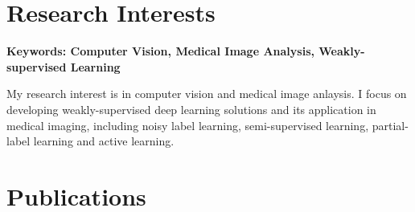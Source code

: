 \documentclass[letterpaper,11pt]{article}
\newcommand{\resumeSubHeadingListStart}{\begin{itemize}[leftmargin=0.15in, label={}]}
\newcommand{\resumeSubHeadingListEnd}{\end{itemize}}
\begin{document}

\section{Research Interests}
  \vspace{2pt}
  \resumeSubHeadingListStart
    \small{\item{
        \textbf{Keywords: Computer Vision, Medical Image Analysis, Weakly-supervised Learning} \\ \vspace{3pt}
        
    }}
    My research interest is in computer vision and medical image anlaysis. I focus on developing weakly-supervised deep learning solutions and its application in medical imaging, including noisy label learning, semi-supervised learning, partial-label learning and active learning.
  \resumeSubHeadingListEnd




\section{Publications}

  \vspace{3pt}
\end{document}
